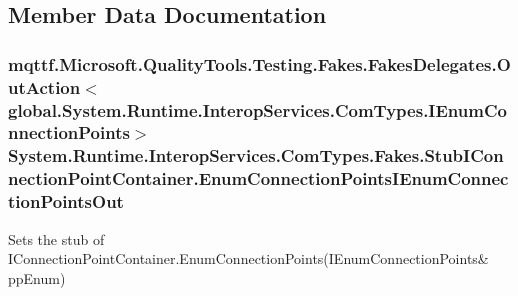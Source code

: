 \subsection{Member Data Documentation}
\hypertarget{class_system_1_1_runtime_1_1_interop_services_1_1_com_types_1_1_fakes_1_1_stub_i_connection_point_container_a806d4cd6d562ad172c28c9a7ce199e87}{
\subsubsection[{Enum\-Connection\-Points\-I\-Enum\-Connection\-Points\-Out}]{\setlength{\rightskip}{0pt plus 5cm}mqttf.\-Microsoft.\-Quality\-Tools.\-Testing.\-Fakes.\-Fakes\-Delegates.\-Out\-Action$<$global.\-System.\-Runtime.\-Interop\-Services.\-Com\-Types.\-I\-Enum\-Connection\-Points$>$ System.\-Runtime.\-Interop\-Services.\-Com\-Types.\-Fakes.\-Stub\-I\-Connection\-Point\-Container.\-Enum\-Connection\-Points\-I\-Enum\-Connection\-Points\-Out}}\label{class_system_1_1_runtime_1_1_interop_services_1_1_com_types_1_1_fakes_1_1_stub_i_connection_point_container_a806d4cd6d562ad172c28c9a7ce199e87}


Sets the stub of I\-Connection\-Point\-Container.\-Enum\-Connection\-Points(I\-Enum\-Connection\-Points\& pp\-Enum)

